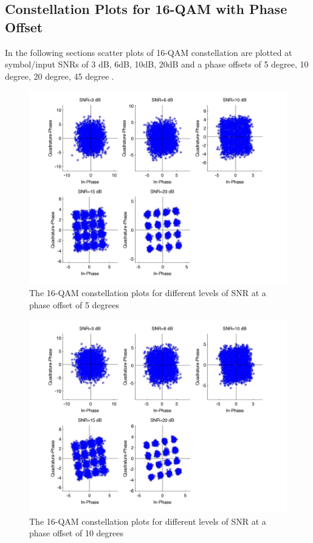 \documentclass[]{article}
\begin{document}
\subsection{Constellation Plots for 16-QAM with Phase Offset}
\label{sec:qam16_phaseConst}
In the following sections scatter plots of  16-QAM constellation are plotted at symbol/input SNRs of 3 dB, 6dB, 10dB, 20dB and a phase offsets of 5 degree, 10 degree, 20 degree, 45 degree .

\begin{figure}[H]
\centering
\hspace*{-2cm}\includegraphics[width=1.3\textwidth]{qam16Constpo1.jpg}
\caption{The 16-QAM constellation plots for different levels of SNR at a phase offset of 5 degrees}
\end{figure}

\begin{figure}[H]
\centering
\hspace*{-2cm}\includegraphics[width=1.3\textwidth]{qam16Constpo2.jpg}
\caption{The 16-QAM constellation plots for different levels of SNR at a phase offset of 10 degrees}
\end{figure}
\end{document}
